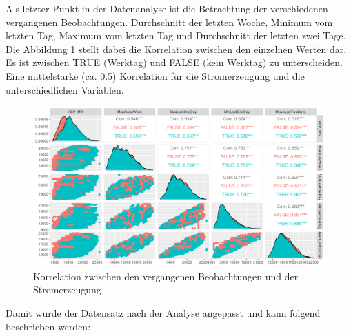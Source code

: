 \documentclass[11pt,ngerman,a4paper,]{article}
\begin{document}
Als letzter Punkt in der Datenanalyse ist die Betrachtung der verschiedenen vergangenen Beobachtungen. Durchschnitt der letzten Woche, Minimum vom letzten Tag, Maximum vom letzten Tag und Durchschnitt der letzten zwei Tage. Die Abbildung \ref{fig:corr} stellt dabei die Korrelation zwischen den einzelnen Werten dar. Es ist zwischen TRUE (Werktag) und FALSE (kein Werktag) zu unterscheiden. Eine mittelstarke (ca. 0.5) Korrelation für die Stromerzeugung und die unterschiedlichen Variablen.

\begin{figure}[H]
\centering
\includegraphics[width=1.0\textwidth]{plots/corr.png}
\caption{Korrelation zwischen den vergangenen Beobachtungen und der Stromerzeugung}
\label{fig:corr}
\end{figure}

Damit wurde der Datensatz nach der Analyse angepasst und kann folgend beschrieben werden:
\end{document}
